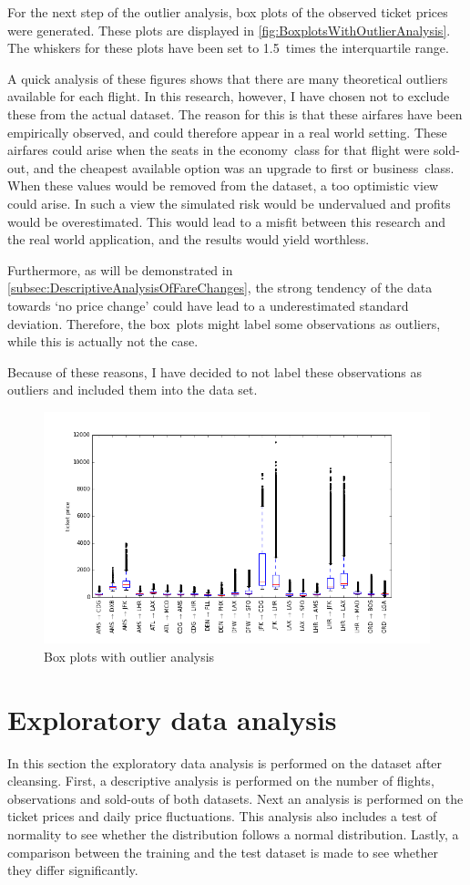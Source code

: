 For the next step of the outlier analysis, box plots of the observed ticket prices were generated. These plots are displayed in \autoref{fig:BoxplotsWithOutlierAnalysis}. The whiskers for these plots have been set to 1.5~times the interquartile range.

A quick analysis of these figures shows that there are many theoretical outliers available for each flight. In this research, however, I have chosen not to exclude these from the actual dataset. The reason for this is that these airfares have been empirically observed, and could therefore appear in a real world setting. These airfares could arise when the seats in the economy~class for that flight were sold-out, and the cheapest available option was an upgrade to first or business~class. When these values would be removed from the dataset, a too optimistic view could arise. In such a view the simulated risk would be undervalued and profits would be overestimated. This would lead to a misfit between this research and the real world application, and the results would yield worthless.

Furthermore, as will be demonstrated in \autoref{subsec:DescriptiveAnalysisOfFareChanges}, the strong tendency of the data towards `no price change' could have lead to a underestimated standard deviation. Therefore, the box~plots might label some observations as outliers, while this is actually not the case.

Because of these reasons, I have decided to not label these observations as outliers and included them into the data set.


\begin{figure}
\centering
\includegraphics[width=.8\textwidth]{figures/outlierAnalysis}
\caption{Box plots with outlier analysis}
\label{fig:BoxplotsWithOutlierAnalysis}
\end{figure}


\section{Exploratory data analysis}
In this section the exploratory data analysis is performed on the dataset after cleansing. First, a descriptive analysis is performed on the number of flights, observations and sold-outs of both datasets. Next an analysis is performed on the ticket prices and daily price fluctuations. This analysis also includes a test of normality to see whether the distribution follows a normal distribution. Lastly, a comparison between the training and the test dataset is made to see whether they differ significantly.

